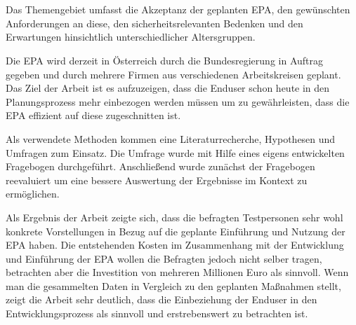 
%
\section*{\thesisheading} %



 Das Themengebiet umfasst die Akzeptanz der geplanten
EPA, den gewünschten Anforderungen an diese, den sicherheitsrelevanten
Bedenken und den Erwartungen hinsichtlich unterschiedlicher Altersgruppen.

 Die EPA wird derzeit in Österreich durch die
Bundesregierung in Auftrag gegeben und durch mehrere Firmen aus verschiedenen
Arbeitskreisen geplant. Das Ziel der Arbeit ist es aufzuzeigen, dass die
Enduser schon heute in den Planungsprozess mehr einbezogen werden müssen um zu
gewährleisten, dass die EPA effizient auf diese zugeschnitten ist.

 Als verwendete Methoden kommen eine
Literaturrecherche, Hypothesen und Umfragen zum Einsatz. Die Umfrage wurde
mit Hilfe eines eigens entwickelten Fragebogen durchgeführt. Anschließend
wurde zunächst der Fragebogen reevaluiert um eine bessere Auswertung der
Ergebnisse im Kontext zu ermöglichen.

 Als Ergebnis der Arbeit zeigte sich, dass die befragten
Testpersonen sehr wohl konkrete Vorstellungen in Bezug auf die geplante
Einführung und Nutzung der EPA haben. Die entstehenden Kosten im Zusammenhang
mit der Entwicklung und Einführung der EPA wollen die Befragten jedoch nicht
selber tragen, betrachten aber die Investition von mehreren Millionen Euro als
sinnvoll. Wenn man die gesammelten Daten in Vergleich zu den geplanten
Maßnahmen stellt, zeigt die Arbeit sehr deutlich, dass die Einbeziehung der
Enduser in den Entwicklungsprozess als sinnvoll und erstrebenswert zu
betrachten ist.


%
\section*{\thesisheading} %


